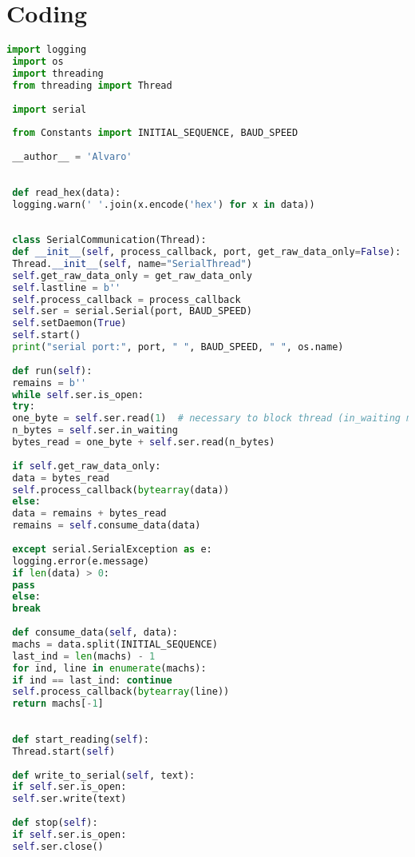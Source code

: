 \documentclass[hidelinks,11pt,a4paper,oneside,article]{memoir}
\begin{document}
\chapter{Coding}\label{appx:first}

 \begin{lstlisting}[label={listing:serialcommunication},caption={Class to get serial data from the cameras},language=Python, style=styleprogramming]
 import logging
 import os
 import threading
 from threading import Thread
 
 import serial
 
 from Constants import INITIAL_SEQUENCE, BAUD_SPEED
 
 __author__ = 'Alvaro'
 
 
 def read_hex(data):
 logging.warn(' '.join(x.encode('hex') for x in data))
 
 
 class SerialCommunication(Thread):
 def __init__(self, process_callback, port, get_raw_data_only=False):
 Thread.__init__(self, name="SerialThread")
 self.get_raw_data_only = get_raw_data_only
 self.lastline = b''
 self.process_callback = process_callback
 self.ser = serial.Serial(port, BAUD_SPEED)
 self.setDaemon(True)
 self.start()
 print("serial port:", port, " ", BAUD_SPEED, " ", os.name)
 
 def run(self):
 remains = b''
 while self.ser.is_open:
 try:
 one_byte = self.ser.read(1)  # necessary to block thread (in_waiting method doesn't block)
 n_bytes = self.ser.in_waiting
 bytes_read = one_byte + self.ser.read(n_bytes)
 
 if self.get_raw_data_only:
 data = bytes_read
 self.process_callback(bytearray(data))
 else:
 data = remains + bytes_read
 remains = self.consume_data(data)
 
 except serial.SerialException as e:
 logging.error(e.message)
 if len(data) > 0:
 pass
 else:
 break
 
 def consume_data(self, data):
 machs = data.split(INITIAL_SEQUENCE)
 last_ind = len(machs) - 1
 for ind, line in enumerate(machs):
 if ind == last_ind: continue
 self.process_callback(bytearray(line))
 return machs[-1]
 
 
 def start_reading(self):
 Thread.start(self)
 
 def write_to_serial(self, text):
 if self.ser.is_open:
 self.ser.write(text)
 
 def stop(self):
 if self.ser.is_open:
 self.ser.close()
 
 \end{lstlisting}
\end{document}
